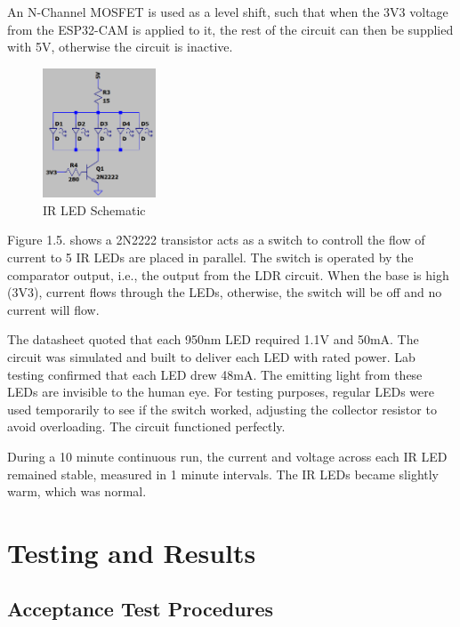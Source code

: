 \documentclass[class=report,11pt,crop=false]{standalone}
\begin{document}
An N-Channel MOSFET is used as a level shift, such that when the 3V3 voltage from the ESP32-CAM is applied to it, the rest of the circuit can then be supplied with 5V, otherwise the circuit is inactive.

\begin{figure}[ht]
\centering
\includegraphics[width=0.3\textwidth]{Images/IR_LED_Array.png}
\caption{IR LED Schematic}
\label{fig:my_label6}
\end{figure}

Figure 1.5. shows a 2N2222 transistor acts as a switch to controll the flow of current to 5 IR LEDs are placed in parallel. The switch is operated by the comparator output, i.e., the output from the LDR circuit. When the base is high (3V3), current flows through the LEDs, otherwise, the switch will be off and no current will flow. 

The datasheet quoted that each 950nm LED required 1.1V and 50mA. The circuit was simulated and built to deliver each LED with rated power. Lab testing confirmed that each LED drew 48mA. The emitting light from these LEDs are invisible to the human eye. For testing purposes, regular LEDs were used temporarily to see if the switch worked, adjusting the collector resistor to avoid overloading. The circuit functioned perfectly. 

During a 10 minute continuous run, the current and voltage across each IR LED remained stable, measured in 1 minute intervals. The IR LEDs became slightly warm, which was normal. 

\section{Testing and Results}
\subsection{Acceptance Test Procedures}
\end{document}
